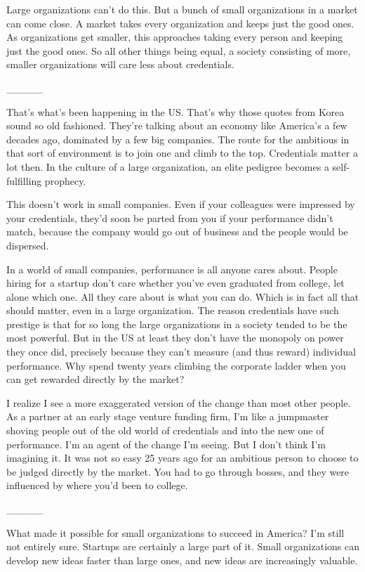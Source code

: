 Large organizations can't do this. But a bunch of small organizations in
a market can come close. A market takes every organization and keeps
just the good ones. As organizations get smaller, this approaches taking
every person and keeping just the good ones. So all other things being
equal, a society consisting of more, smaller organizations will care
less about credentials.

\_\_\_\_\_

That's what's been happening in the US. That's why those quotes from
Korea sound so old fashioned. They're talking about an economy like
America's a few decades ago, dominated by a few big companies. The route
for the ambitious in that sort of environment is to join one and climb
to the top. Credentials matter a lot then. In the culture of a large
organization, an elite pedigree becomes a self-fulfilling prophecy.

This doesn't work in small companies. Even if your colleagues were
impressed by your credentials, they'd soon be parted from you if your
performance didn't match, because the company would go out of business
and the people would be dispersed.

In a world of small companies, performance is all anyone cares about.
People hiring for a startup don't care whether you've even graduated
from college, let alone which one. All they care about is what you can
do. Which is in fact all that should matter, even in a large
organization. The reason credentials have such prestige is that for so
long the large organizations in a society tended to be the most
powerful. But in the US at least they don't have the monopoly on power
they once did, precisely because they can't measure (and thus reward)
individual performance. Why spend twenty years climbing the corporate
ladder when you can get rewarded directly by the market?

I realize I see a more exaggerated version of the change than most other
people. As a partner at an early stage venture funding firm, I'm like a
jumpmaster shoving people out of the old world of credentials and into
the new one of performance. I'm an agent of the change I'm seeing. But I
don't think I'm imagining it. It was not so easy 25 years ago for an
ambitious person to choose to be judged directly by the market. You had
to go through bosses, and they were influenced by where you'd been to
college.

\_\_\_\_\_

What made it possible for small organizations to succeed in America? I'm
still not entirely sure. Startups are certainly a large part of it.
Small organizations can develop new ideas faster than large ones, and
new ideas are increasingly valuable.

